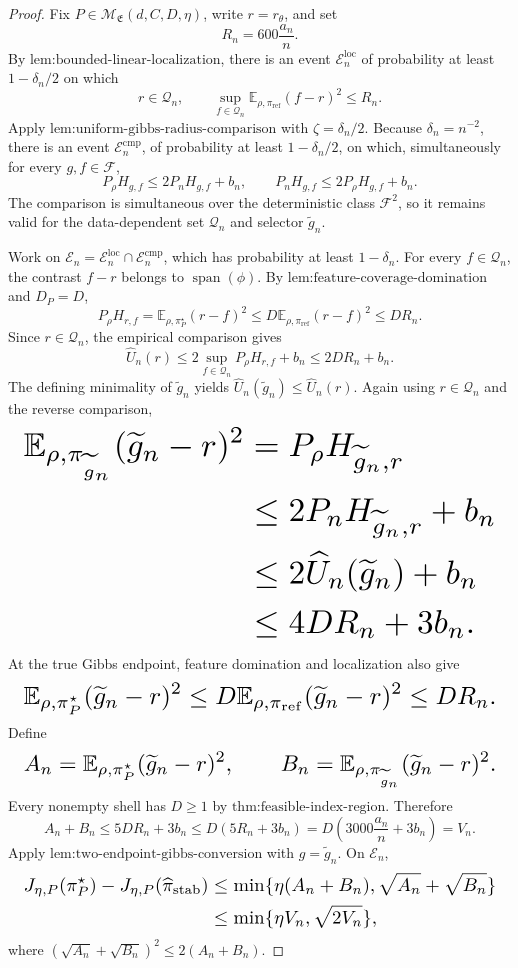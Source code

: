 \documentclass{article}
\begin{document}
\begin{proof}
Fix \(P\in\mathcal M_{\mathfrak E}(d,C,D,\eta)\), write \(r=r_\theta\), and set
\[
R_n=600\frac{a_n}{n}.
\]
By \(\text{lem:bounded-linear-localization}\), there is an event \(\mathcal E_n^{\mathrm{loc}}\) of probability at least \(1-\delta_n/2\) on which
\[
r\in\mathcal Q_n,
\qquad
\sup_{f\in\mathcal Q_n}\mathbb E_{\rho,\pi_{\mathrm{ref}}}(f-r)^2\le R_n.
\]
Apply \(\text{lem:uniform-gibbs-radius-comparison}\) with \(\zeta=\delta_n/2\). Because \(\delta_n=n^{-2}\), there is an event \(\mathcal E_n^{\mathrm{cmp}}\), of probability at least \(1-\delta_n/2\), on which, simultaneously for every \(g,f\in\mathcal F\),
\[
P_\rho H_{g,f}\le2P_nH_{g,f}+b_n,
\qquad
P_nH_{g,f}\le2P_\rho H_{g,f}+b_n.
\]
The comparison is simultaneous over the deterministic class \(\mathcal F^2\), so it remains valid for the data-dependent set \(\mathcal Q_n\) and selector \(\widetilde g_n\).

Work on \(\mathcal E_n=\mathcal E_n^{\mathrm{loc}}\cap\mathcal E_n^{\mathrm{cmp}}\), which has probability at least \(1-\delta_n\). For every \(f\in\mathcal Q_n\), the contrast \(f-r\) belongs to \(\operatorname{span}(\phi)\). By \(\text{lem:feature-coverage-domination}\) and \(D_P=D\),
\[
P_\rho H_{r,f}
=\mathbb E_{\rho,\pi_P^\star}(r-f)^2
\le D\mathbb E_{\rho,\pi_{\mathrm{ref}}}(r-f)^2
\le DR_n.
\]
Since \(r\in\mathcal Q_n\), the empirical comparison gives
\[
\widehat U_n(r)
\le2\sup_{f\in\mathcal Q_n}P_\rho H_{r,f}+b_n
\le2DR_n+b_n.
\]
The defining minimality of \(\widetilde g_n\) yields \(\widehat U_n(\widetilde g_n)\le\widehat U_n(r)\). Again using \(r\in\mathcal Q_n\) and the reverse comparison,
\[
\makebox[\linewidth][c]{\resizebox{0.98\linewidth}{!}{\(\displaystyle \begin{aligned}
\mathbb E_{\rho,\pi_{\widetilde g_n}}(\widetilde g_n-r)^2
&=P_\rho H_{\widetilde g_n,r}\\
&\le2P_nH_{\widetilde g_n,r}+b_n\\
&\le2\widehat U_n(\widetilde g_n)+b_n\\
&\le4DR_n+3b_n.
\end{aligned}\)}}
\]
At the true Gibbs endpoint, feature domination and localization also give
\[
\makebox[\linewidth][c]{\resizebox{0.98\linewidth}{!}{\(\displaystyle \mathbb E_{\rho,\pi_P^\star}(\widetilde g_n-r)^2
\le D\mathbb E_{\rho,\pi_{\mathrm{ref}}}(\widetilde g_n-r)^2
\le DR_n.\)}}
\]
Define
\[
\makebox[\linewidth][c]{\resizebox{0.98\linewidth}{!}{\(\displaystyle A_n=\mathbb E_{\rho,\pi_P^\star}(\widetilde g_n-r)^2,
\qquad
B_n=\mathbb E_{\rho,\pi_{\widetilde g_n}}(\widetilde g_n-r)^2.\)}}
\]
Every nonempty shell has \(D\ge1\) by \(\text{thm:feasible-index-region}\). Therefore
\[
A_n+B_n\le5DR_n+3b_n
\le D(5R_n+3b_n)
=D\left(3000\frac{a_n}{n}+3b_n\right)=V_n.
\]
Apply \(\text{lem:two-endpoint-gibbs-conversion}\) with \(g=\widetilde g_n\). On \(\mathcal E_n\),
\[
\makebox[\linewidth][c]{\resizebox{0.98\linewidth}{!}{\(\displaystyle \begin{aligned}
J_{\eta,P}(\pi_P^\star)-J_{\eta,P}(\widehat\pi_{\mathrm{stab}})
&\le\min\{\eta(A_n+B_n),\sqrt{A_n}+\sqrt{B_n}\}\\
&\le\min\{\eta V_n,\sqrt{2V_n}\},
\end{aligned}\)}}
\]
where \((\sqrt{A_n}+\sqrt{B_n})^2\le2(A_n+B_n)\).


\end{proof}
\end{document}
